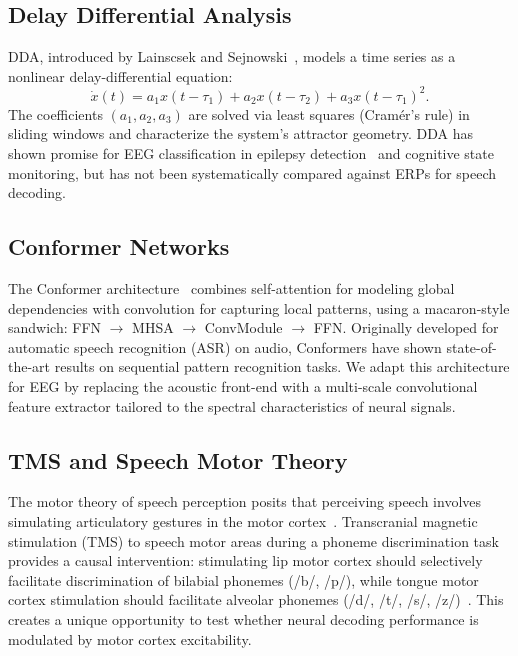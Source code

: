 \documentclass[11pt,a4paper]{article}
\begin{document}
\subsection{Delay Differential Analysis}

DDA, introduced by Lainscsek and Sejnowski~\cite{lainscsek2015}, models a time
series as a nonlinear delay-differential equation:
\[
  \dot{x}(t) = a_1 x(t{-}\tau_1) + a_2 x(t{-}\tau_2) + a_3 x(t{-}\tau_1)^2.
\]
The coefficients $(a_1, a_2, a_3)$ are solved via least squares (Cram\'er's
rule) in sliding windows and characterize the system's attractor geometry. DDA
has shown promise for EEG classification in epilepsy
detection~\cite{lainscsek2017} and cognitive state monitoring, but has not been
systematically compared against ERPs for speech decoding.

\subsection{Conformer Networks}

The Conformer architecture~\cite{gulati2020} combines self-attention for
modeling global dependencies with convolution for capturing local patterns,
using a macaron-style sandwich: FFN $\to$ MHSA $\to$ ConvModule $\to$ FFN.
Originally developed for automatic speech recognition (ASR) on audio,
Conformers have shown state-of-the-art results on sequential pattern
recognition tasks. We adapt this architecture for EEG by replacing the acoustic
front-end with a multi-scale convolutional feature extractor tailored to the
spectral characteristics of neural signals.

\subsection{TMS and Speech Motor Theory}

The motor theory of speech perception posits that perceiving speech involves
simulating articulatory gestures in the motor cortex~\cite{liberman1985}.
Transcranial magnetic stimulation (TMS) to speech motor areas during a phoneme
discrimination task provides a causal intervention: stimulating lip motor cortex
should selectively facilitate discrimination of bilabial phonemes (/b/, /p/),
while tongue motor cortex stimulation should facilitate alveolar phonemes
(/d/, /t/, /s/, /z/)~\cite{dausilio2009}. This creates a unique opportunity to
test whether neural decoding performance is modulated by motor cortex
excitability.

\end{document}
